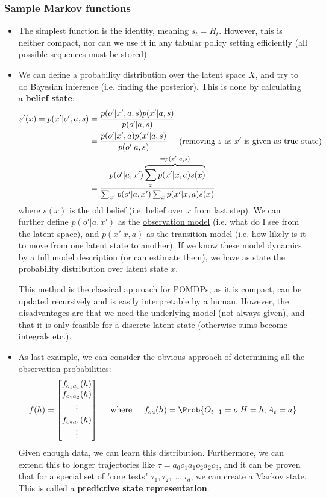 \subsubsection{Sample Markov functions}
\begin{itemize}
	\item The simplest function is the identity, meaning $s_t=H_t$. However, this is neither compact, nor can we use it in any tabular policy setting efficiently (all possible sequences must be stored).
	\item We can define a probability distribution over the latent space $X$, and try to do Bayesian inference (i.e. finding the posterior). This is done by calculating a \textbf{belief state}:
	\begin{equation*}
		\begin{split}
			s'(x)=p(x'|o',a,s)& =\frac{p(o'|x',a,s)p(x'|a,s)}{p(o'|a,s)}\\
			& = \frac{p(o'|x',a)p(x'|a,s)}{p(o'|a,s)}\hspace{5mm}\text{(removing $s$ as $x'$ is given as true state)}\\
			& = \frac{p(o'|a,x')\overbrace{\sum_x p(x'|x,a)s(x)}^{=p(x'|a,s)}}{\sum_{x'}p(o'|a,x')\sum_x p(x'|x,a)s(x)}
		\end{split}
	\end{equation*}
	where $s(x)$ is the old belief (i.e. belief over $x$ from last step). We can further define $p(o'|a,x')$ as the \underline{observation model} (i.e. what do I see from the latent space), and $p(x'|x,a)$ as the \underline{transition model} (i.e. how likely is it to move from one latent state to another). If we know these model dynamics by a full model description (or can estimate them), we have as state the probability distribution over latent state $x$.
	
	This method is the classical approach for POMDPs, as it is compact, can be updated recursively and is easily interpretable by a human. However, the disadvantages are that we need the underlying model (not always given), and that it is only feasible for a discrete latent state (otherwise sums become integrals etc.).
	\item As last example, we can consider the obvious approach of determining all the observation probabilities:
	$$f(h)=\begin{bmatrix}
	f_{o_1a_1}(h)\\ f_{o_1a_2}(h)\\\vdots\\f_{o_2a_1}(h)\\\vdots\\
	\end{bmatrix}\hspace{5mm}\text{where}\hspace{5mm}f_{oa}(h)=\Prob{O_{t+1}=o|H=h,A_t=a}$$
	Given enough data, we can learn this distribution. Furthermore, we can extend this to longer trajectories like $\tau=a_0o_1a_1o_2a_2o_3$, and it can be proven that for a special set of "core tests" $\tau_1,\tau_2,...,\tau_d$, we can create a Markov state. This is called a \textbf{predictive state representation}.
	

\end{itemize}
